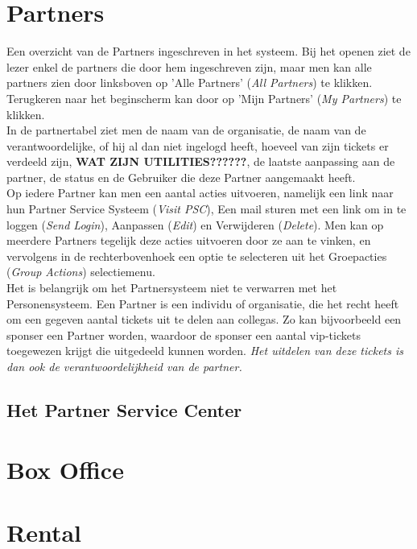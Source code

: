 \documentclass[]{memoir}
\begin{document}
\section{Partners}
Een overzicht van de Partners ingeschreven in het systeem. Bij het openen ziet de lezer enkel de partners die door hem ingeschreven zijn, maar men kan alle partners zien door linksboven op 'Alle Partners' (\textsl{All Partners}) te klikken. Terugkeren naar het beginscherm kan door op 'Mijn Partners' (\textsl{My Partners}) te klikken.\\
In de partnertabel ziet men de naam van de organisatie, de naam van de verantwoordelijke, of hij al dan niet ingelogd heeft, hoeveel van zijn tickets er verdeeld zijn, \textbf{WAT ZIJN UTILITIES??????}, de laatste aanpassing aan de partner, de status en de Gebruiker die deze Partner aangemaakt heeft.\\
Op iedere Partner kan men een aantal acties uitvoeren, namelijk een link naar hun Partner Service Systeem  (\textsl{Visit PSC}), Een mail sturen met een link om in te loggen  (\textsl{Send Login}), Aanpassen (\textsl{Edit}) en Verwijderen (\textsl{Delete}).
Men kan op meerdere Partners tegelijk deze acties uitvoeren door ze aan te vinken, en vervolgens in de rechterbovenhoek een optie te selecteren uit het Groepacties  (\textsl{Group Actions}) selectiemenu.\\

Het is belangrijk om het Partnersysteem niet te verwarren met het Personensysteem. Een Partner is een individu of organisatie, die het recht heeft om een gegeven aantal tickets uit te delen aan collegas. Zo kan bijvoorbeeld een sponser een Partner worden, waardoor de sponser een aantal vip-tickets toegewezen krijgt die uitgedeeld kunnen worden. \textsl{Het uitdelen van deze tickets is dan ook de verantwoordelijkheid van de partner.}

\subsection{Het Partner Service Center}


\section{Box Office}

\section{Rental}
\end{document}
